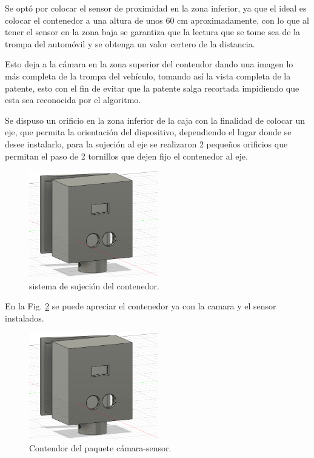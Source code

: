 Se optó por colocar el sensor de proximidad en la zona inferior, ya que el ideal es colocar el contenedor a una altura de unos 60 cm 
aproximadamente, con lo que al tener el sensor en la zona baja se garantiza que la lectura que se tome sea de la trompa del automóvil y se 
obtenga un valor certero de la distancia.

Esto deja a la cámara en la zona superior del contendor dando una imagen lo más completa de la trompa del vehículo, tomando así la vista 
completa de la patente, esto con el fin de evitar que la patente salga recortada impidiendo que esta sea reconocida por el algoritmo.

Se dispuso un orificio en la zona inferior de la caja con la finalidad de colocar un eje, que permita la orientación del dispositivo, dependiendo 
el lugar donde se desee instalarlo, para la sujeción al eje se realizaron 2 pequeños orificios que permitan el paso de 2 tornillos que dejen fijo
el contenedor al eje.
\begin{figure}
    \centering
    \includegraphics[width=0.5\textwidth]{imgs/contenedor-camara.png}
    \caption{sistema de sujeción del contenedor.}
    \label{fig:sujecion-contenedor}
\end{figure}

En la Fig. \ref{fig:contenedor-camara-real} se puede apreciar el contenedor ya con la camara y el sensor instalados.

\begin{figure}
    \centering
    \includegraphics[width=0.5\textwidth]{imgs/contenedor-camara.png}
    \caption{Contendor del paquete cámara-sensor.}
    \label{fig:contenedor-camara-real}
\end{figure}

